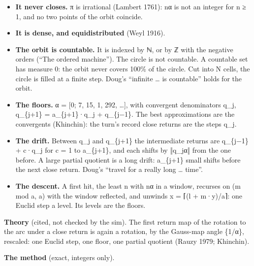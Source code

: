 \begin{itemize}
\item \textbf{It never closes.} π is irrational (Lambert 1761): nα is not an integer for n ≥ 1, and no two points of the orbit coincide.
\item \textbf{It is dense, and equidistributed} (Weyl 1916).
\item \textbf{The orbit is countable.} It is indexed by ℕ, or by ℤ with the negative orders (“The ordered machine”). The circle is not countable. A countable set has measure 0: the orbit never covers 100\% of the circle. Cut into N cells, the circle is filled at a finite step. Doug's “infinite … is countable” holds for the orbit.
\item \textbf{The floors.} α = [0; 7, 15, 1, 292, …], with convergent denominators q\_\allowbreak{}j, q\_\allowbreak{}\{j+1\} = a\_\allowbreak{}\{j+1\}·q\_\allowbreak{}j + q\_\allowbreak{}\{j−1\}. The best approximations are the convergents (Khinchin): the turn's record close returns are the steps q\_\allowbreak{}j.
\item \textbf{The drift.} Between q\_\allowbreak{}j and q\_\allowbreak{}\{j+1\} the intermediate returns are q\_\allowbreak{}\{j−1\} + c·q\_\allowbreak{}j for c = 1 to a\_\allowbreak{}\{j+1\}, and each shifts by ‖q\_\allowbreak{}jα‖ from the one before. A large partial quotient is a long drift: a\_\allowbreak{}\{j+1\} small shifts before the next close return. Doug's “travel for a really long … time”.
\item \textbf{The descent.} A first hit, the least n with nα in a window, recurses on (m mod a, a) with the window reflected, and unwinds x = ⌈(l + m·y)/a⌉: one Euclid step a level. Its levels are the floors.
\end{itemize}

\textbf{Theory} (cited, not checked by the sim). The first return map of the rotation to the arc under a close return is again a rotation, by the Gauss-map angle \{1/α\}, rescaled: one Euclid step, one floor, one partial quotient (Rauzy 1979; Khinchin).

\textbf{The method} (exact, integers only).


